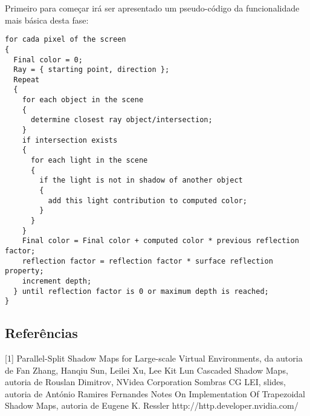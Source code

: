 \documentclass[12pt]{article}
\begin{document}
Primeiro para começar irá ser apresentado um pseudo-código da funcionalidade mais básica desta fase:

\begin{lstlisting}
for cada pixel of the screen
{
  Final color = 0;
  Ray = { starting point, direction };
  Repeat
  {
    for each object in the scene
    {
      determine closest ray object/intersection;
    }
    if intersection exists
    {
      for each light in the scene
      {
        if the light is not in shadow of another object
        {
          add this light contribution to computed color;
        }
      }
    }
    Final color = Final color + computed color * previous reflection factor;
    reflection factor = reflection factor * surface reflection property;
    increment depth;
  } until reflection factor is 0 or maximum depth is reached;
}
\end{lstlisting}

\subsection{Referências}

[1] Parallel-Split Shadow Maps for Large-scale Virtual Environments, da autoria de Fan Zhang, Hanqiu Sun, Leilei Xu, Lee Kit Lun \newline
[2] Cascaded Shadow Maps, autoria de Rouslan Dimitrov, NVidea Corporation \newline
[3] Sombras CG LEI, slides, autoria de António Ramires Fernandes \newline
[4] Notes On Implementation Of Trapezoidal Shadow Maps, autoria de Eugene K. Ressler \newline
[5] http://http.developer.nvidia.com/ \newline
\end{document}
